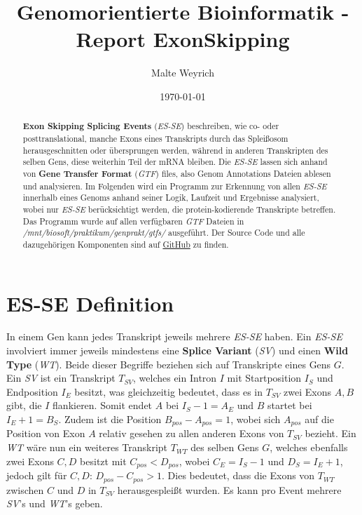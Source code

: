 \documentclass[12pt]{article}
\title{Genomorientierte Bioinformatik - Report ExonSkipping}
\author{
  Malte Weyrich
}
\date{\today}
\begin{document}
\maketitle
\begin{abstract}
	\textbf{Exon Skipping Splicing Events} (\textit{ES-SE}) beschreiben, wie co- oder posttranslational,
	manche Exons eines Transkripts durch das Splei\ss osom herausgeschnitten oder übersprungen werden, während
	in anderen Transkripten des selben Gens, diese weiterhin Teil der mRNA bleiben.
	Die \textit{ES-SE} lassen sich anhand von \textbf{Gene Transfer Format} (\textit{GTF}) files,
	also Genom Annotations Dateien ablesen und analysieren.
	Im Folgenden wird ein Programm zur Erkennung von allen \textit{ES-SE} innerhalb eines Genoms
	anhand seiner Logik, Laufzeit und Ergebnisse analysiert, wobei nur \textit{ES-SE} berücksichtigt werden,
	die protein-kodierende Transkripte betreffen. Das Programm wurde auf allen verfügbaren
	\textit{GTF} Dateien in \textit{/mnt/biosoft/praktikum/genprakt/gtfs/} ausgeführt.
    Der Source Code und alle dazugehörigen Komponenten sind auf \href{https://github.com/mweyrich28/exonSkipping}{GitHub} zu finden.
\end{abstract}

\newpage
\tableofcontents
\newpage



\section{ES-SE Definition}\label{sec:problem}
In einem Gen kann jedes Transkript jeweils mehrere \textit{ES-SE} haben.
Ein \textit{ES-SE} involviert immer jeweils mindestens eine \textbf{Splice Variant} (\textit{SV}) und einen
\textbf{Wild Type} (\textit{WT}). Beide dieser Begriffe beziehen sich auf Transkripte eines Gens $G$.
Ein \textit{SV} ist ein Transkript $T_{SV}$, welches ein Intron $I$ mit Startposition $I_{S}$ und Endposition
$I_{E}$ besitzt, was gleichzeitig bedeutet, dass es in $T_{SV}$ zwei Exons $A, B$ gibt, die $I$ flankieren. Somit endet $A$ bei $I_{S} - 1 = A_{E}$ und $B$ startet bei $I_{E} + 1 = B_{S}$.
Zudem ist die Position $B_{pos} - A_{pos} = 1$, wobei sich $A_{pos}$ auf die Position von Exon $A$ relativ gesehen
zu allen anderen Exons von $T_{SV}$ bezieht.
Ein \textit{WT} wäre nun ein weiteres Transkript $T_{WT}$ des selben Gens $G$, welches ebenfalls
zwei Exons $C, D$ besitzt mit $C_{pos} < D_{pos}$, wobei $C_{E} = I_{S} - 1$ und $D_{S} = I_{E} + 1$,
jedoch gilt für $C, D$: $D_{pos} - C_{pos} > 1$.
Dies bedeutet, dass die Exons von $T_{WT}$ zwischen $C$ und $D$ in $T_{SV}$ herausgesplei\ss t wurden.
Es kann pro Event mehrere \textit{SV}'s und \textit{WT}'s geben.
\end{document}
